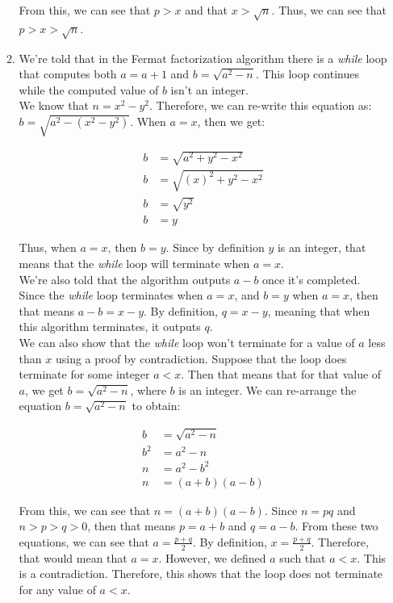 \documentclass[11pt]{article}
\theoremstyle{definition}
\begin{document}
\begin{enumerate}
\begin{enumerate}
From this, we can see that $p > x$ and that $x > \sqrt{n}$. Thus, we can see that $p > x > \sqrt{n}$.


\item  %
We're told that in the Fermat factorization algorithm there is a \textit{while} loop that computes both $a = a + 1$ and $b = \sqrt{a^2 - n}$. This loop continues while the computed value of $b$ isn't an integer. \\

We know that $n = x^2 - y^2$. Therefore, we can re-write this equation as: $b = \sqrt{a^2 - (x^2 - y^2)}$. When $a = x$, then we get:

\begin{align*}
    b &= \sqrt{a^2 + y^2 - x^2} \\
    b &= \sqrt{(x)^2 + y^2 - x^2} \\
    b &= \sqrt{y^2} \\
    b &= y
\end{align*}

Thus, when $a = x$, then $b = y$. Since by definition $y$ is an integer, that means that the \textit{while} loop will terminate when $a = x$. \\

We're also told that the algorithm outputs $a - b$ once it's completed. Since the \textit{while} loop terminates when $a = x$, and $b = y$ when $a = x$, then that means $a - b = x - y$. By definition, $q = x - y$, meaning that when this algorithm terminates, it outputs $q$. \\

We can also show that the \textit{while} loop won't terminate for a value of $a$ less than $x$ using a proof by contradiction. Suppose that the loop does terminate for some integer $a < x$. Then that means that for that value of $a$, we get $b = \sqrt{a^2 - n}$, where $b$ is an integer. We can re-arrange the equation $b = \sqrt{a^2 - n}$ to obtain:

\begin{align*}
    b &= \sqrt{a^2 - n} \\
    b^2 &= a^2 - n \\
    n &= a^2 - b^2 \\
    n &= (a + b)(a - b)
\end{align*}

From this, we can see that $n = (a + b)(a - b)$. Since $n = pq$ and $n > p > q > 0$, then that means $p = a + b$ and $q = a - b$. From these two equations, we can see that $a = \frac{p + q}{2}$. By definition, $x = \frac{p + q}{2}$. Therefore, that would mean that $a = x$. However, we defined $a$ such that $a < x$. This is a contradiction. Therefore, this shows that the loop does not terminate for any value of $a < x$.


\end{enumerate}
\end{enumerate}
\end{document}
